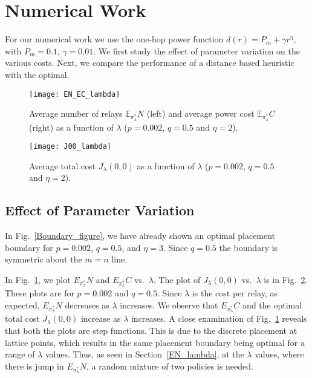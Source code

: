 \documentclass[conference]{IEEEtran}
\begin{document}
\section{Numerical Work}
\label{numerical_work_section}
For our numerical work we use the one-hop power function
$d(r)=P_m+\gamma r^{\eta}$, with $P_m=0.1$, $\gamma=0.01$.
 We first study the effect of parameter variation
on the various costs. Next, we compare the performance of 
a distance based heuristic with the optimal.

\begin{figure}[t!]
\centering
\texttt{[image: EN\_EC\_lambda]}
\caption{Average number of relays $\mathbb{E}_{\pi_{\lambda}^*} N$ (left) and average power cost $\mathbb{E}_{\pi_{\lambda}^*} C$ (right) as a function of $\lambda$ ($p=0.002$, $q=0.5$ and $\eta=2$).}
\label{EN_EC_lambda_figure}
\end{figure}

\begin{figure}[t]
\centering
\texttt{[image: J00\_lambda]}
\caption{Average total cost $J_{\lambda}(0,0)$ as a function of $\lambda$ ($p=0.002$, $q=0.5$ and $\eta=2$).}
\label{J00_lambda_figure}
\end{figure}




\subsection{Effect of Parameter Variation}
In Fig.~\ref{Boundary_figure}, we have already shown an optimal placement
boundary for $p = 0.002$, $q = 0.5$, and $\eta=3$. Since $q=0.5$ the
boundary is symmetric about the $m=n$ line.

In Fig.~\ref{EN_EC_lambda_figure}, we plot $E_{\pi_\lambda^*}N$ and
$E_{\pi_\lambda^*}C$ vs.\ $\lambda$. The plot of $J_\lambda(0,0)$ vs.\
$\lambda$ is in Fig.~\ref{J00_lambda_figure}.  These plots are for
$p=0.002$ and $q=0.5$. Since $\lambda$ is the cost per relay, as
expected, $E_{\pi_\lambda^*}N$ decreases as $\lambda$ increases. We
observe that $E_{\pi_\lambda^*} C$ and the optimal total cost
$J_\lambda(0,0)$ increase as $\lambda$ increases. A close examination
of Fig.~\ref{EN_EC_lambda_figure} reveals that both the plots are step
functions.  This is due to the discrete placement at lattice points,
which results in the same placement boundary being optimal for a range
of $\lambda$ values. Thus, as seen in Section~\ref{EN_lambda}, at the
$\lambda$ values, where there is jump in $E_{\pi_\lambda^*} N$, a
random mixture of two policies is needed.
\end{document}
